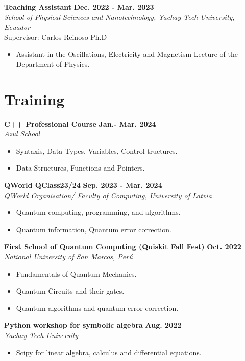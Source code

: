 \documentclass[a4paper,12pt]{article}
\begin{document}
\textbf{Teaching Assistant}
\hfill {\textbf{Dec. 2022 - Mar. 2023}}\\
\emph{School of Physical Sciences and Nanotechnology, Yachay Tech University, Ecuador}\\
Supervisor: Carlos Reinoso Ph.D
\begin{itemize}
    \item Assistant in the Oscillations, Electricity and Magnetism Lecture of the Department of Physics.
\end{itemize}
\section{Training}
\textbf{C++ Professional Course} \hfill{\textbf{Jan.- Mar. 2024}}\\
\emph{Azul School }
\begin{itemize}
    \item Syntaxis, Data Types, Variables, Control tructures.
    \item Data Structures, Functions and Pointers.
\end{itemize}

\textbf{ QWorld QClass23/24} \hfill{\textbf{Sep. 2023 - Mar. 2024}}\\
\emph{QWorld Organisation/ Faculty of Computing, University of Latvia }
\begin{itemize}
    \item Quantum computing, programming, and algorithms.
    \item Quantum information, Quantum error correction.
\end{itemize}

\textbf{First School of Quantum Computing (Quiskit Fall Fest)} \hfill {\textbf{Oct. 2022}}\\
\emph{National University of San Marcos, Perú}
\begin{itemize}
    \item Fundamentals of Quantum Mechanics.
    \item Quantum Circuits and their gates.
    \item Quantum algorithms and quantum error correction.
\end{itemize}

\textbf{Python workshop for symbolic algebra} \hfill {\textbf{Aug. 2022}}\\
\emph{Yachay Tech University}
\begin{itemize}
    \item Scipy for linear algebra, calculus and differential equations.
\end{itemize}
\end{document}
